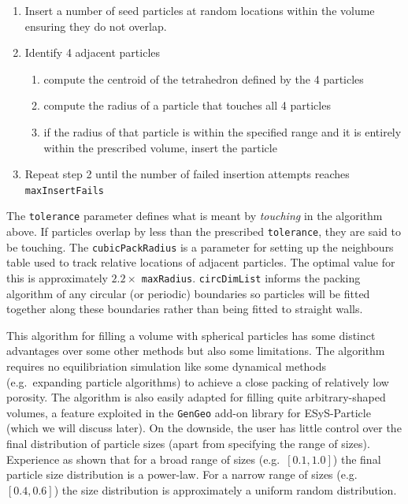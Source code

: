 \begin{enumerate}
\item Insert a number of seed particles at random locations within the volume ensuring they do not overlap.
\item Identify 4 adjacent particles 
\begin{enumerate}
\item compute the centroid of the tetrahedron defined by the 4 particles 
\item compute the radius of a particle that touches all 4 particles
\item if the radius of that particle is within the specified range and it is entirely within the prescribed volume, insert the particle
\end{enumerate}
\item Repeat step 2 until the number of failed insertion attempts reaches \texttt{maxInsertFails}
\end{enumerate}

\noindent
The \texttt{tolerance} parameter defines what is meant by \emph{touching} in the algorithm above. If particles overlap by less than the prescribed \texttt{tolerance}, they are said to be touching. The \texttt{cubicPackRadius} is a parameter for setting up the neighbours table used to track relative locations of adjacent particles. The optimal value for this is approximately $2.2 \times$ \texttt{maxRadius}. \texttt{circDimList} informs the packing algorithm of any circular (or periodic) boundaries so particles will be fitted together along these boundaries rather than being fitted to straight walls.

This algorithm for filling a volume with spherical particles has some distinct advantages over some other methods but also some limitations. The algorithm requires no equilibriation simulation like some dynamical methods (e.g.\ expanding particle algorithms) to achieve a close packing of relatively low porosity. The algorithm is also easily adapted for filling quite arbitrary-shaped volumes, a feature exploited in the \texttt{GenGeo} add-on library for ESyS-Particle (which we will discuss later). On the downside, the user has little control over the final distribution of particle sizes (apart from specifying the range of sizes). Experience as shown that for a broad range of sizes (e.g.\ $[0.1, 1.0]$) the final particle size distribution is a power-law. For a narrow range of sizes (e.g. $[0.4,0.6]$) the size distribution is approximately a uniform random distribution. 

